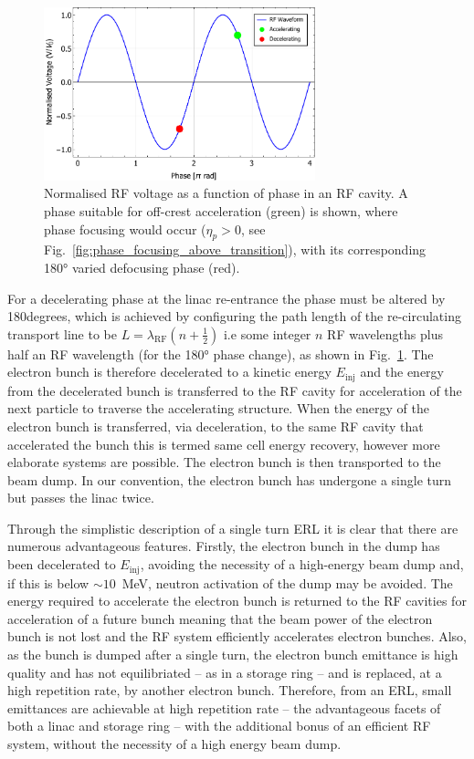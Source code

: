 \documentclass[../main.tex]{subfiles}
\begin{document}
\begin{figure}[!h]
\centering
\includegraphics[width=0.7\textwidth]{Figures/Energy_Recovery_Linac_Design/ERL_acc_deacc_RF_phase.pdf}
\caption{Normalised RF voltage as a function of phase in an RF cavity. A phase suitable for off-crest acceleration (green) is shown, where phase focusing would occur ($\eta_{p}>0$, see Fig.~\ref{fig:phase_focusing_above_transition}), with its corresponding 180\si{\degree} varied defocusing phase (red).}
\label{eq:ERL_RF_acceleration_phase}
\end{figure}

For a decelerating phase at the linac re-entrance the phase must be altered by 180\si{degrees}, which is achieved by configuring the path length of the re-circulating transport line to be $L= \lambda_{\mathrm{RF}}\left(n+\frac{1}{2}\right)$ i.e some integer $n$ RF wavelengths plus half an RF wavelength (for the 180\si{\degree} phase change), as shown in Fig.~\ref{eq:ERL_RF_acceleration_phase}. The electron bunch is therefore decelerated to a kinetic energy $E_{\mathrm{inj}}$ and the energy from the decelerated bunch is transferred to the RF cavity for acceleration of the next particle to traverse the accelerating structure. When the energy of the electron bunch is transferred, via deceleration, to the same RF cavity that accelerated the bunch this is termed same cell energy recovery, however more elaborate systems are possible. The electron bunch is then transported to the beam dump. In our convention, the electron bunch has undergone a single turn but passes the linac twice.

Through the simplistic description of a single turn ERL it is clear that there are numerous advantageous features. Firstly, the electron bunch in the dump has been decelerated to $E_{\mathrm{inj}}$, avoiding the necessity of a high-energy beam dump and, if this is below $\sim10$~\si{\mega\electronvolt}, neutron activation of the dump may be avoided. The energy required to accelerate the electron bunch is returned to the RF cavities for acceleration of a future bunch meaning that the beam power of the electron bunch is not lost and the RF system efficiently accelerates electron bunches. Also, as the bunch is dumped after a single turn, the electron bunch emittance is high quality and has not equilibriated -- as in a storage ring \cite{} -- and is replaced, at a high repetition rate, by another electron bunch. Therefore, from an ERL, small emittances are achievable at high repetition rate -- the advantageous facets of both a linac and storage ring -- with the additional bonus of an efficient RF system, without the necessity of a high energy beam dump. 
\end{document}
